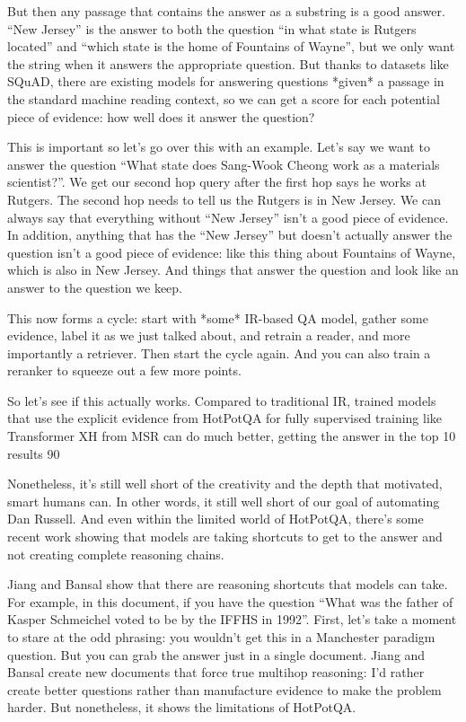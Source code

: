 But then any passage that contains the answer as a substring is a good answer.  “New Jersey” is the answer to both the question “in what state is Rutgers located” and “which state is the home of Fountains of Wayne”, but we only want the string when it answers the appropriate question.  But thanks to datasets like SQuAD, there are existing models for answering questions *given* a passage in the standard machine reading context, so we can get a score for each potential piece of evidence: how well does it answer the question?

This is important so let’s go over this with an example.  Let’s say we want to answer the question “What state does Sang-Wook Cheong work as a materials scientist?”.  We get our second hop query after the first hop says he works at Rutgers.  The second hop needs to tell us the Rutgers is in New Jersey.  We can always say that everything without “New Jersey” isn’t a good piece of evidence.  In addition, anything that has the “New Jersey” but doesn’t actually answer the question isn’t a good piece of evidence: like this thing about Fountains of Wayne, which is also in New Jersey.  And things that answer the question and look like an answer to the question we keep.

This now forms a cycle: start with *some* IR-based QA model, gather some evidence, label it as we just talked about, and retrain a reader, and more importantly a retriever.  Then start the cycle again.  And you can also train a reranker to squeeze out a few more points.

So let’s see if this actually works.  Compared to traditional IR, trained models that use the explicit evidence from HotPotQA for fully supervised training like Transformer XH from MSR can do much better, getting the answer in the top 10 results 90%

Nonetheless, it’s still well short of the creativity and the depth that motivated, smart humans can.  In other words, it still well short of our goal of automating Dan Russell.  And even within the limited world of HotPotQA, there’s some recent work showing that models are taking shortcuts to get to the answer and not creating complete reasoning chains.

Jiang and Bansal show that there are reasoning shortcuts that models can take.  For example, in this document, if you have the question “What was the father of Kasper Schmeichel voted to be by the IFFHS in 1992”.  First, let’s take a moment to stare at the odd phrasing: you wouldn’t get this in a Manchester paradigm question.  But you can grab the answer just in a single document.  Jiang and Bansal create new documents that force true multihop reasoning: I’d rather create better questions rather than manufacture evidence to make the problem harder.  But nonetheless, it shows the limitations of HotPotQA.


